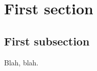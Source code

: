 \documentclass[a4paper, 11pt, oneside]{article}
\begin{document}
% 

\tableofcontents
\newpage

\section{First section}

\subsection{First subsection}
Blah, blah.
\end{document}
